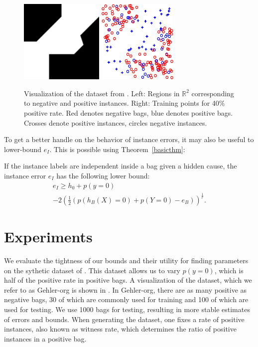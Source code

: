 \begin{figure}[tbp]
	\begin{center}
		\includegraphics[height=40mm]{images/gehler_decision_boundary.png}\hspace{5px}
		\includegraphics[height=40mm]{images/gehler_instances.png}
	\end{center}
	\caption{Visualization of the dataset from \citet{gehler2007deterministic}. Left: Regions in $\mathbb{R}^2$
    corresponding to negative and positive instances. Right: Training points for 40\% positive rate. Red denotes negative
    bags, blue denotes positive bags. Crosses denote positive instances, circles negative instances.}

\end{figure}
To get a better handle on the behavior of instance errors, it may also be useful to lower-bound $e_I$.
This is possible using Theorem~\ref{basicthm}:

\begin{theorem}\label{lowerbound}
If the instance labels are independent inside a bag given a hidden cause, the instance
error $e_I$ has the following lower bound:
\begin{multline*}
e_I \geq h_0 + p(y=0)\\ 
- 2 \left (\frac{1}{2} (p(h_B(X)=0) + p(Y=0) - e_B) \right)^\frac{1}{r}.
\end{multline*}
\end{theorem}


\section{Experiments}
We evaluate the tightness of our bounds and their utility for finding parameters on the sythetic dataset of \citet{gehler2007deterministic}.
This dataset allows us to vary $p(y=0)$, which is half of the positive rate in positive bags.
A visualization of the dataset, which we refer to as Gehler-org is shown in . In Gehler-org, there are as many positive
as negative bags, 30 of which are commonly used for training and 100 of which are used for testing.
We use 1000 bags for testing, resulting in more stable estimates of errors and bounds.
When generating the dataset, one fixes a rate of positive instances, also known as witness rate, which determines the ratio
of positive instances in a positive bag.

